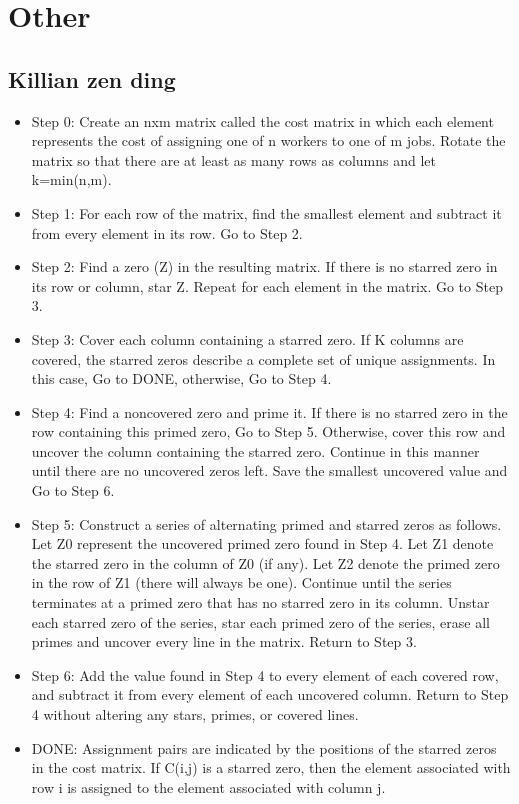 \documentclass[a4paper,10pt,oneside]{report}
\begin{document}
\chapter{Other}
\section{Killian zen ding}
\begin{itemize}

 \item  Step 0:  Create an nxm  matrix called the cost matrix in which each element represents the cost of assigning one of n workers to one of m jobs.  Rotate the matrix so that there are at least as many rows as columns and let k=min(n,m).

  \item   Step 1:  For each row of the matrix, find the smallest element and subtract it from every element in its row.  Go to Step 2.

    \item  Step 2:  Find a zero (Z) in the resulting matrix.  If there is no starred zero in its row or column, star Z. Repeat for each element in the matrix. Go to Step 3.

 \item Step 3:  Cover each column containing a starred zero.  If K columns are covered, the starred zeros describe a complete set of unique assignments.  In this case, Go to DONE, otherwise, Go to Step 4.

 \item Step 4:  Find a noncovered zero and prime it.  If there is no starred zero in the row containing this primed zero, Go to Step 5.  Otherwise, cover this row and uncover the column containing the starred zero. Continue in this manner until there are no uncovered zeros left. Save the smallest uncovered value and Go to Step 6.

 \item Step 5:  Construct a series of alternating primed and starred zeros as follows.  Let Z0 represent the uncovered primed zero found in Step 4.  Let Z1 denote the starred zero in the column of Z0 (if any). Let Z2 denote the primed zero in the row of Z1 (there will always be one).  Continue until the series terminates at a primed zero that has no starred zero in its column.  Unstar each starred zero of the series, star each primed zero of the series, erase all primes and uncover every line in the matrix.  Return to Step 3.

 \item Step 6:  Add the value found in Step 4 to every element of each covered row, and subtract it from every element of each uncovered column.  Return to Step 4 without altering any stars, primes, or covered lines.

 \item DONE:  Assignment pairs are indicated by the positions of the starred zeros in the cost matrix.  If C(i,j) is a starred zero, then the element associated with row i is assigned to the element associated with column j.
 
\end{itemize}
\end{document}
